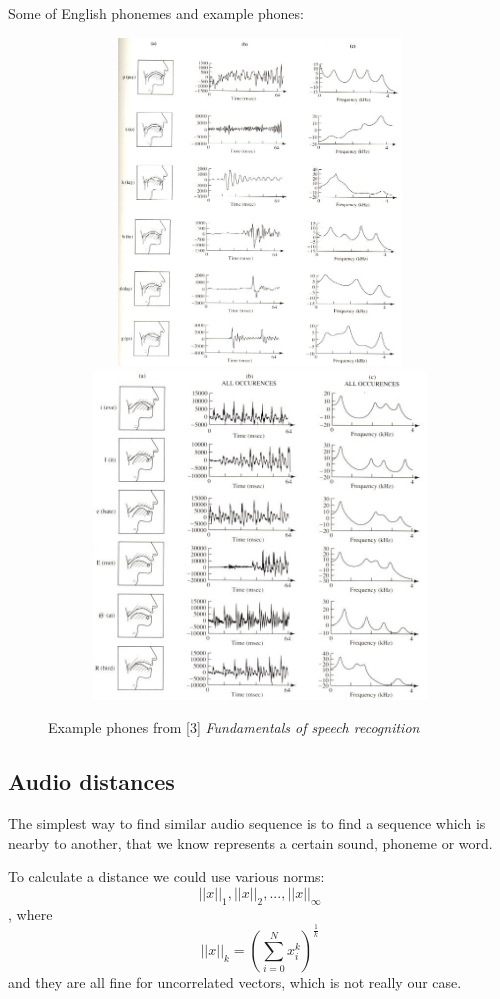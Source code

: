 \documentclass[12pt,a4paper,english]{article}
\begin{document}
\newpage
Some of English phonemes and example phones:
\begin{figure}[hb]
    \centering
    \includegraphics[height=8.7cm, width=13cm]{example_phones_1.jpg}
    \includegraphics[height=8.7cm, width=13cm]{example_phones_2.jpg}
    \caption[]{Example phones from [3] \emph{Fundamentals of speech recognition}}
\end{figure}

\newpage
\subsection{Audio distances}

The simplest way to find similar audio sequence is to find a sequence which is nearby to another,
that we know represents a certain sound, phoneme or word. \newline

To calculate a distance we could use various norms:
\begin{equation}
    ||x||_1 , || x ||_2, ... , || x ||_\infty
\end{equation}
, where 
\begin{equation}
    ||x||_k = (\sum_{i=0}^{N} x_i^k)^\frac{1}{k}
\end{equation}
and they are all fine for uncorrelated vectors, which is not really our case. \newline
\end{document}
